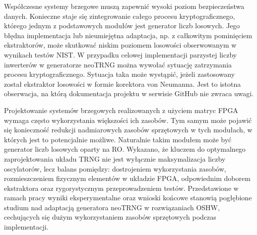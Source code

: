 \noindent Współczesne systemy brzegowe muszą zapewnić wysoki poziom bezpieczeństwa danych. 
Konieczne staje się zintegrowanie całego procesu kryptograficznego, którego 
jednym z podstawowych modułów jest generator liczb losowych. Jego błędna 
implementacja lub nieumiejętna adaptacja, np. z całkowitym pominięciem 
ekstraktorów, może skutkować niskim poziomem losowości obserwowanym w wynikach 
testów NIST. W przypadku celowej implementacji parzystej liczby inwerterów w 
generatorze neoTRNG można wywołać sytuację zatrzymania procesu kryptograficznego. 
Sytuacja taka może wystąpić, jeżeli zastosowany został ekstraktor losowości w 
formie korektora von Neumanna. Jest to istotna obserwacja, na którą dokumentacja 
projektu w serwisie GitHub nie zwraca uwagi.

Projektowanie systemów brzegowych realizowanych z użyciem matryc FPGA wymaga 
często wykorzystania większości ich zasobów. Tym samym może pojawić się 
konieczność redukcji nadmiarowych zasobów sprzętowych w tych modułach, w 
których jest to potencjalnie możliwe. Naturalnie takim modułem może być 
generator liczb losowych oparty na RO. Wykazano, że kluczem do optymalnego 
zaprojektowania układu TRNG nie jest wyłącznie maksymalizacja liczby 
oscylatorów, lecz balans pomiędzy: dostrojeniem wykorzystania zasobów, 
rozmieszczeniem fizycznym elementów w układzie FPGA, odpowiednim doborem 
ekstraktora oraz rygorystycznym przeprowadzeniem testów. Przedstawione w 
ramach pracy wyniki eksperymentalne oraz wnioski końcowe stanowią pogłębione 
studium nad adaptacją generatora neoTRNG w rozwiązaniach OSHW, cechujących się 
dużym wykorzystaniem zasobów sprzętowych podczas implementacji.